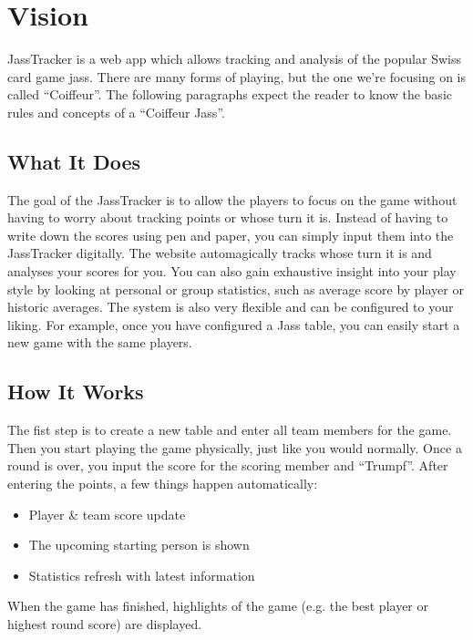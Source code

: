 \chapter{Vision}

JassTracker is a web app which allows tracking and analysis of the popular Swiss card game \gls{jass}.
There are many forms of playing, but the one we're focusing on is called ``Coiffeur''.
The following paragraphs expect the reader to know the basic rules and concepts of a ``Coiffeur Jass''.

\section*{What It Does}
The goal of the JassTracker is to allow the players to focus on the game without having to worry about tracking points or whose turn it is.
Instead of having to write down the scores using pen and paper, you can simply input them into the JassTracker digitally.
The website automagically tracks whose turn it is and analyses your scores for you.
You can also gain exhaustive insight into your play style by looking at personal or group statistics, such as average score by player or historic averages.
The system is also very flexible and can be configured to your liking.
For example, once you have configured a Jass table, you can easily start a new game with the same players.

\section*{How It Works}
The fist step is to create a new table and enter all team members for the game.
Then you start playing the game physically, just like you would normally.
Once a round is over, you input the score for the scoring member and ``Trumpf''.
After entering the points, a few things happen automatically:
\begin{itemize}
    \item Player \& team score update
    \item The upcoming starting person is shown
    \item Statistics refresh with latest information
\end{itemize}
When the game has finished, highlights of the game (e.g. the best player or highest round score) are displayed.

